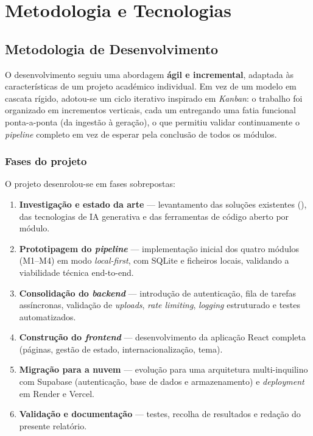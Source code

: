 \chapter{Metodologia e Tecnologias}
\label{cap:metodologia}

\section{Metodologia de Desenvolvimento}
\label{sec:metodologia}

O desenvolvimento seguiu uma abordagem \textbf{ágil e incremental},
adaptada às características de um projeto académico individual. Em vez de
um modelo em cascata rígido, adotou-se um ciclo iterativo inspirado em
\emph{Kanban}: o trabalho foi organizado em incrementos verticais, cada
um entregando uma fatia funcional ponta-a-ponta (da ingestão à geração),
o que permitiu validar continuamente o \emph{pipeline} completo em vez de
esperar pela conclusão de todos os módulos.

\subsection{Fases do projeto}

O projeto desenrolou-se em fases sobrepostas:

\begin{enumerate}[label=\textbf{F\arabic*.},leftmargin=*]
  \item \textbf{Investigação e estado da arte} — levantamento das
  soluções existentes (), das tecnologias de IA
  generativa e das ferramentas de código aberto por módulo.
  \item \textbf{Prototipagem do \emph{pipeline}} — implementação inicial
  dos quatro módulos (M1--M4) em modo \emph{local-first}, com SQLite e
  ficheiros locais, validando a viabilidade técnica end-to-end.
  \item \textbf{Consolidação do \emph{backend}} — introdução de
  autenticação, fila de tarefas assíncronas, validação de \emph{uploads},
  \emph{rate limiting}, \emph{logging} estruturado e testes automatizados.
  \item \textbf{Construção do \emph{frontend}} — desenvolvimento da
  aplicação React completa (páginas, gestão de estado,
  internacionalização, tema).
  \item \textbf{Migração para a nuvem} — evolução para uma arquitetura
  multi-inquilino com Supabase (autenticação, base de dados e
  armazenamento) e \emph{deployment} em Render e Vercel.
  \item \textbf{Validação e documentação} — testes, recolha de resultados
  e redação do presente relatório.
\end{enumerate}

